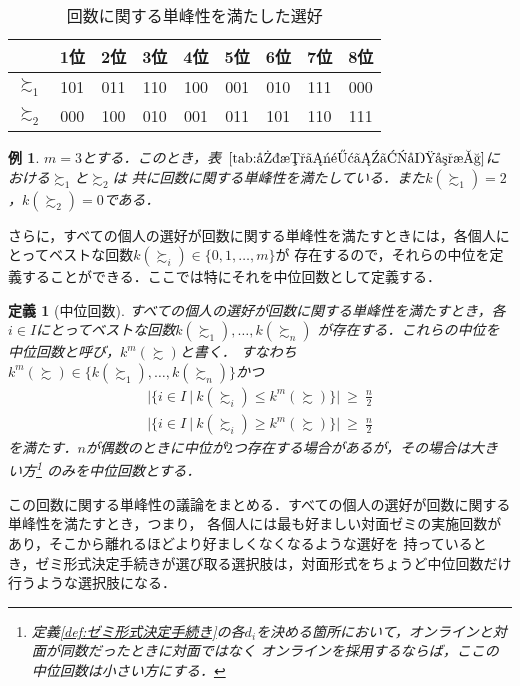 \documentclass[dvipdfmx]{jsarticle}
\newtheorem{definition}{定義}[section]
\newtheorem{example}{例}[section]
\begin{document}
  \begin{table}[h]
    \caption{回数に関する単峰性を満たした選好}\label{tab:回数に関する単峰性}
    \begin{center}
      \begin{tabular}{c|cccccccc}
          & 1位 & 2位 & 3位 & 4位 & 5位 & 6位 & 7位 & 8位 \\ \hline
        $\succsim_1$ & 101 & 011 & 110 & 100 & 001 & 010 & 111 & 000 \\ \hline
        $\succsim_2$ & 000 & 100 & 010 & 001 & 011 & 101 & 110 & 111 \\
      \end{tabular}
    \end{center}
  \end{table}

\begin{example}
  $m=3$とする．このとき，表~$\ref{tab:回数に関する単峰性}$における$\succsim_1$と$\succsim_2$は
  共に回数に関する単峰性を満たしている．また$k(\succsim_1) = 2$，$k(\succsim_2) = 0$である．
\end{example}

さらに，すべての個人の選好が回数に関する単峰性を満たすときには，各個人にとってベストな回数$k(\succsim_i) \in \{0,1,\ldots,m\}$が
存在するので，それらの中位を定義することができる．ここでは特にそれを中位回数として定義する．

\begin{definition}[中位回数]\label{def:中位回数}
  すべての個人の選好が回数に関する単峰性を満たすとき，各$i \in I$にとってベストな回数$k(\succsim_1),\ldots,k(\succsim_n)$
  が存在する．これらの中位を中位回数と呼び，$k^m(\succsim)$と書く．
  すなわち$k^m(\succsim) \in \{k(\succsim_1), \ldots, k(\succsim_n) \}$かつ
  \begin{gather*}
    |\{i \in I \ | \ k(\succsim_i) \leq k^m(\succsim) \}| \ \geq \ \frac{n}{2} \\
    |\{i \in I \ | \ k(\succsim_i) \geq k^m(\succsim) \}| \ \geq \ \frac{n}{2}
  \end{gather*}
  を満たす．$n$が偶数のときに中位が$2$つ存在する場合があるが，その場合は大きい方\footnote{
    定義\ref{def:ゼミ形式決定手続き}の各$d_i$を決める箇所において，オンラインと対面が同数だったときに対面ではなく
    オンラインを採用するならば，ここの中位回数は小さい方にする．
  }
  のみを中位回数とする．
\end{definition}

この回数に関する単峰性の議論をまとめる．すべての個人の選好が回数に関する単峰性を満たすとき，つまり，
各個人には最も好ましい対面ゼミの実施回数があり，そこから離れるほどより好ましくなくなるような選好を
持っているとき，ゼミ形式決定手続きが選び取る選択肢は，対面形式をちょうど中位回数だけ行うような選択肢になる．
\end{document}
